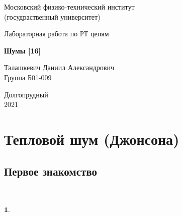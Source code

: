 \documentclass[a4paper, 14pt]{extarticle}%
\date{}
\begin{document}
\begin{titlepage}

	\newpage
	\begin{center}
		\normalsize Московский физико-технический институт \\(госудраственный 			университет)
	\end{center}

	\vspace{6em}

	\begin{center}
		\Large Лабораторная работа по РТ цепям\\
	\end{center}

	\vspace{1em}

	\begin{center}
		\large \textbf{Шумы [16]}
	\end{center}

	\vspace{2em}

	\begin{center}
		\large Талашкевич Даниил Александрович\\
		Группа Б01-009
	\end{center}

	\vspace{\fill}

	\begin{center}
	Долгопрудный \\2021
	\end{center}
	
\end{titlepage}



	\thispagestyle{empty}
	\newpage
	\tableofcontents
	\newpage
	\setcounter{page}{1}



\section{Тепловой шум (Джонсона)}

\subsection{Первое знакомство}

$ $

$\textbf{1.}$
\end{document}
